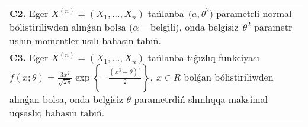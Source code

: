 \documentclass{article}
\begin{document}
\begin{tabular}{m{17cm}}
 \\
\textbf{C2.} 
Eger \(X^{(n)} = \left( X_{1},...,X_{n} \right)\) tańlanba\({\ \ (a,\theta}^{2})\) parametrli normal bólistiriliwden alınǵan bolsa (\(\alpha -\)belgili), onda belgisiz\({\ \ \theta}^{2}\) parametr ushın momentler usılı bahasın tabıń.
 \\
\textbf{C3.} 
Eger \(X^{(n)} = \left( X_{1},...,X_{n} \right)\) tańlanba tıǵızlıq funkciyası
$f(x;\theta) = \frac{3x^{2}}{\sqrt{2\pi}}\exp\left\{ - \frac{\left( x^{3} - \theta \right)^{2}}{2} \right\},\ x \in R$
bolǵan bólistiriliwden alınǵan bolsa, onda belgisiz \(\theta\) parametrdiń shınlıqqa maksimal uqsaslıq bahasın tabıń.
 \\

\end{tabular}
\vspace{1cm}
\end{document}
